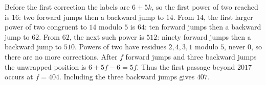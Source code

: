 Before the first correction the labels are $6+5k$, so the first power of two reached is $16$: two forward jumps then a backward jump to $14$. From $14$, the first larger power of two congruent to $14$ modulo $5$ is $64$: ten forward jumps then a backward jump to $62$. From $62$, the next such power is $512$: ninety forward jumps then a backward jump to $510$. Powers of two have residues $2,4,3,1$ modulo $5$, never $0$, so there are no more corrections. After $f$ forward jumps and three backward jumps the unwrapped position is $6+5f-6=5f$. Thus the first passage beyond $2017$ occurs at $f=404$. Including the three backward jumps gives $\boxed{407}$.
